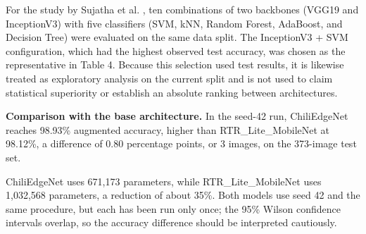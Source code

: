 For the study by Sujatha et al. \cite{sujatha2025}, ten combinations of two backbones (VGG19 and InceptionV3) with five classifiers (SVM, kNN, Random Forest, AdaBoost, and Decision Tree) were evaluated on the same data split. The InceptionV3 + SVM configuration, which had the highest observed test accuracy, was chosen as the representative in Table 4. Because this selection used test results, it is likewise treated as exploratory analysis on the current split and is not used to claim statistical superiority or establish an absolute ranking between architectures.

\textbf{Comparison with the base architecture.} In the seed-42 run, ChiliEdgeNet reaches 98.93\% augmented accuracy, higher than RTR\_Lite\_MobileNet \cite{duhan2025} at 98.12\%, a difference of 0.80 percentage points, or 3 images, on the 373-image test set.

ChiliEdgeNet uses 671,173 parameters, while RTR\_Lite\_MobileNet uses 1,032,568 parameters, a reduction of about 35\%. Both models use seed 42 and the same procedure, but each has been run only once; the 95\% Wilson confidence intervals overlap, so the accuracy difference should be interpreted cautiously.

